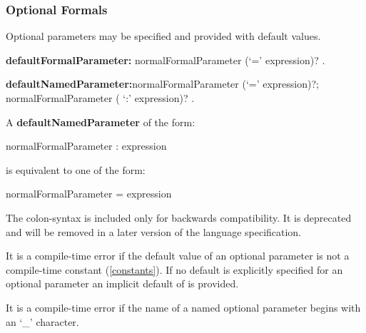 \documentclass{article}
\begin{document}


\subsubsection{Optional Formals}

\LMHash{}
Optional parameters may be specified and provided with default values.

\begin{grammar}
{\bf defaultFormalParameter:}
      normalFormalParameter (`=' expression)?
    .

{\bf defaultNamedParameter:}normalFormalParameter (`=' expression)?;
      normalFormalParameter ( `{\escapegrammar :}' expression)?
    .
\end{grammar}

A {\bf defaultNamedParameter} of the form:
\begin{code}
   normalFormalParameter : expression
\end{code}
is equivalent to one of the form:
\begin{code}
   normalFormalParameter = expression
\end{code}
The colon-syntax is included only for backwards compatibility.
It is deprecated and will be removed in a later version of the language specification.

\LMHash{}
It is a compile-time error if the default value of an optional parameter is not a compile-time constant (\ref{constants}). If no default is explicitly specified for an optional parameter an implicit default of \NULL{} is provided.

\LMHash{}
It is a compile-time error if the name of a named optional parameter begins with an `\_' character.

\end{document}
